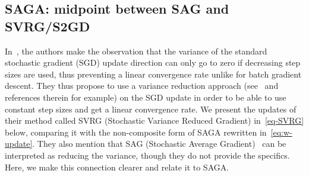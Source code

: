 \documentclass{article}
\newcommand{\stepsize}{\gamma} %
\begin{document}
%
%

\vspace{-2mm}
\subsection*{SAGA: midpoint between SAG and SVRG/S2GD}
\label{subsec:sag}

In~\citep{svrg}, the authors make the observation that the variance of the standard stochastic gradient (SGD) update direction can only go to zero if decreasing step sizes are used, thus preventing a linear convergence rate unlike for batch gradient descent. They thus propose to use a variance reduction approach (see~\citep{variance-reduction} and references therein for example) on the SGD update in order to be able to use constant step sizes and get a linear convergence rate. We present the updates of their method called SVRG (Stochastic Variance Reduced Gradient) in~\eqref{eq-SVRG} below, comparing it with the non-composite form of SAGA rewritten in~\eqref{eq:w-update}. They also mention that SAG (Stochastic Average Gradient)~\citep{SAG} can be interpreted as reducing the variance, though they do not provide the specifics. Here, we make this connection clearer and relate it to SAGA. 
\end{document}
